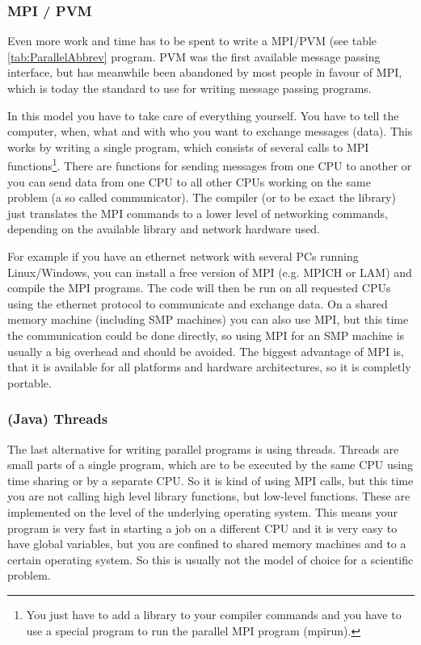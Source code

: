 \subsubsection{MPI / PVM}
Even more work and time has to be spent to write a MPI/PVM (see table
\ref{tab:ParallelAbbrev} program. PVM was
the first available message passing interface, but has meanwhile been
abandoned by most people in favour of MPI, which is today the standard to use
for writing message passing programs. 

In this model you have to 
take care of everything yourself. You have to tell the computer, when, what and 
with who you want to exchange messages (data). This works by writing a single
program, which consists of several calls to MPI functions\footnote{You just have
to add a library to your compiler commands and you have to use a special program
to run the parallel MPI program (mpirun).}. There are functions for
sending messages from one CPU to another or you can send data from one CPU to
all other CPUs working on the same problem (a so called communicator).
The compiler (or to be  exact the library) just translates the MPI commands
to a lower level of networking commands, depending on the available library and
network hardware used. 

For example if you have an ethernet network with
several PCs running Linux/Windows, you can install a free version of MPI
(e.g. MPICH or LAM) and compile the MPI programs. The code will then be run on all
requested CPUs using the ethernet protocol to communicate and exchange data.
On a shared memory machine (including SMP machines) 
you can also use MPI, but this time the communication could
be done directly, so using MPI for an SMP machine is usually a big overhead
and should be avoided. The biggest advantage of MPI is, that it is available
for all platforms and hardware architectures, so it is completly portable.

\subsubsection{(Java) Threads}
The last alternative for writing parallel programs is using threads. Threads are small
parts of a single program, which are to be executed by the same CPU using
time sharing or by a separate CPU. 
So it is kind of using MPI calls, but this time you are not calling
high level library functions, but low-level functions.
These are implemented on the level of the underlying operating system.
This means your program is very fast in starting a job on a different CPU
and it is very easy to have global variables, but you are confined to
shared memory machines and to a certain operating system. So this is usually
not the model of choice for a scientific problem. 

